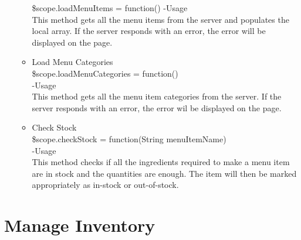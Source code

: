 \documentclass[a4paper,12pt]{article}
\begin{document}
\begin{enumerate}
\begin{itemize}
		\$scope.loadMenuItems = function()
		-Usage\\
		This method gets all the menu items from the server and populates the local array. If the server responds with an error, the error will be displayed on the page.
		\item Load Menu Categories\\
		\$scope.loadMenuCategories = function()\\
		-Usage\\
		This method gets all the menu item categories from the server. If the server responds with an error, the error wil be displayed on the page.
		\item Check Stock\\
		\$scope.checkStock = function(String menuItemName)\\
		-Usage\\
		This method checks if all the ingredients required to make a menu item are in stock and the quantities are enough. The item will then be marked appropriately as in-stock or out-of-stock.
	\end{itemize}
	
\end{enumerate}
\section{Manage Inventory}
\end{document}
